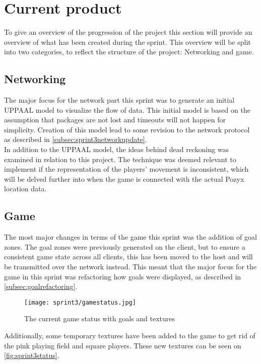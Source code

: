 \section{Current product}
To give an overview of the progression of the project this section will provide an overview of what has been created during the sprint.
This overview will be split into two categories, to reflect the structure of the project: Networking and game.

\subsection{Networking}
The major focus for the network part this sprint was to generate an initial UPPAAL model to visualize the flow of data.
This initial model is based on the assumption that packages are not lost and timeouts will not happen for simplicity.
Creation of this model lead to some revision to the network protocol as described in \autoref{subsec:sprint3networkupdate}.\\
In addition to the UPPAAL model, the ideas behind dead reckoning was examined in relation to this project.
The technique was deemed relevant to implement if the representation of the players' movement is inconsistent, which will be delved further into when the game is connected with the actual Pozyx location data.

\subsection{Game}
The most major changes in terms of the game this sprint was the addition of goal zones.
The goal zones were previously generated on the client, but to ensure a consistent game state across all clients, this has been moved to the host and will be transmitted over the network instead.
This meant that the major focus for the game in this sprint was refactoring how goals were displayed, as described in \ref{subsec:goalrefactoring}.

\begin{figure}[H]
	\centering
	\texttt{[image: sprint3/gamestatus.jpg]}
	\caption{The current game status with goals and textures}
	\label{fig:sprint3status}
\end{figure}
\noindent
Additionally, some temporary textures have been added to the game to get rid of the pink playing field and square players.
These new textures can be seen on \autoref{fig:sprint3status}.
